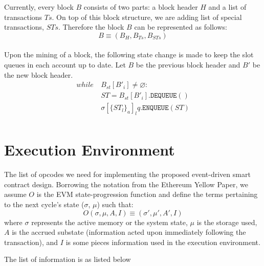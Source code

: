\documentclass{article}
\begin{document}
Currently, every block $B$ consists of two parts: a block header $H$ and a list of transactions $Ts$. On top of this block structure, we are adding list of special transactions, $STs$. Therefore the block $B$ can be represented as follows:
\begin{equation*}
    B \equiv (B_H, B_{Ts}, B_{STs})
\end{equation*}
\\
Upon the mining of a block, the following state change is made to keep the slot queues in each account up to date. Let $B$ be the previous block header and $B'$ be the new block header.
\begin{align*}
    while \ &B_{st}[B'_i] \neq \varnothing: \\
    &ST = B_{st}[B'_i].\texttt{DEQUEUE}() \\
    &\sigma[\{ST_l\}_a]_lq.\texttt{ENQUEUE}(ST) \\
\end{align*}

\newpage
\section{Execution Environment}
The list of opcodes we need for implementing the proposed event-driven smart contract design. Borrowing the notation from the Ethereum Yellow Paper, we assume $O$ is the EVM state-progression function and define the terms pertaining to the next cycle’s state ($\sigma$, $\mu$) such that:
\begin{equation*}
    O(\sigma, \mu, A, I) \equiv (\sigma', \mu', A', I)
\end{equation*}
where $\sigma$ represents the active memory or the system state, $\mu$ is the storage used, $A$ is the accrued substate (information acted upon immediately following the transaction), and $I$ is some pieces information used in the execution environment. 

The list of information is as listed below\\
\end{document}
